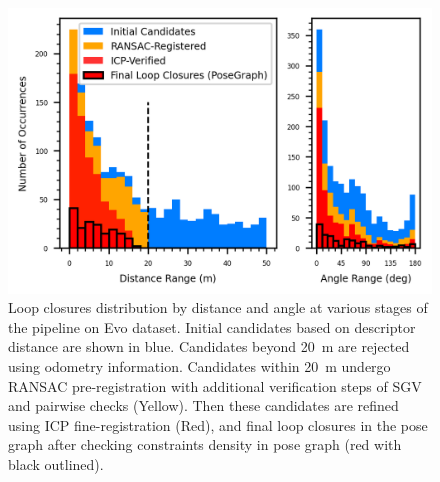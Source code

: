\begin{figure}[htbp]
  \centering
  \includegraphics[width=0.85\columnwidth]{pics/exp_2_2_loop_closure_histograms}
  \caption{Loop closures distribution by distance and angle at various stages of the pipeline on Evo dataset.
   Initial candidates based on descriptor distance are shown in blue. Candidates beyond \SI{20}{\meter} are rejected using odometry information. Candidates within \SI{20}{\meter} undergo RANSAC pre-registration with additional verification steps of SGV\cite{vidanapathirana2023ral} and pairwise checks (Yellow). Then these candidates are refined using ICP fine-registration (Red), and final loop closures in the pose graph after checking constraints density in pose graph (red with black outlined).}
  \label{fig:exp_2_2_loop_closure_histograms}
\end{figure}



